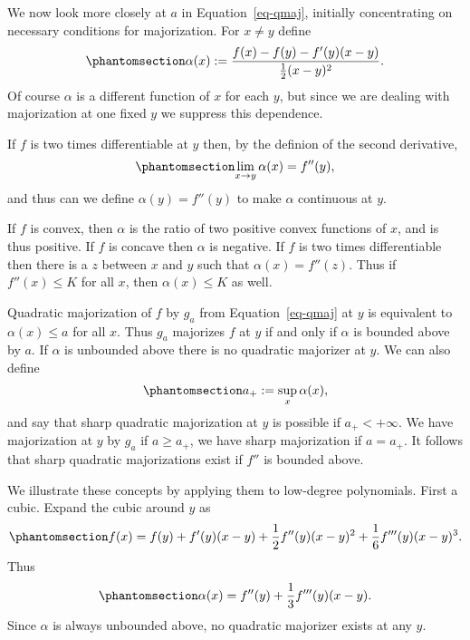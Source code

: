 \documentclass[
  12pt,
  letterpaper,
  DIV=11,
  numbers=noendperiod]{scrartcl}
\theoremstyle{plain}
\theoremstyle{plain}
\theoremstyle{plain}
\theoremstyle{definition}
\theoremstyle{definition}
\theoremstyle{remark}
\begin{document}
We now look more closely at \(a\) in Equation~\ref{eq-qmaj}, initially
concentrating on necessary conditions for majorization. For
\(x\not = y\) define \begin{equation}\phantomsection\label{eq-alpdef}{
\alpha(x):=\frac{f(x)-f(y)-f'(y)(x-y)}{\frac12(x-y)^2}.
}\end{equation} Of course \(\alpha\) is a different function of \(x\)
for each \(y\), but since we are dealing with majorization at one fixed
\(y\) we suppress this dependence.

If \(f\) is two times differentiable at \(y\) then, by the definion of
the second derivative, \begin{equation}\phantomsection\label{eq-alphop}{
\lim_{x\rightarrow y}\alpha(x)=f''(y),
}\end{equation} and thus can we define \(\alpha(y)=f''(y)\) to make
\(\alpha\) continuous at \(y\).

If \(f\) is convex, then \(\alpha\) is the ratio of two positive convex
functions of \(x\), and is thus positive. If \(f\) is concave then
\(\alpha\) is negative. If \(f\) is two times differentiable then there
is a \(z\) between \(x\) and \(y\) such that \(\alpha(x)=f''(z)\). Thus
if \(f''(x)\leq K\) for all \(x\), then \(\alpha(x)\leq K\) as well.

Quadratic majorization of \(f\) by \(g_a\) from Equation~\ref{eq-qmaj}
at \(y\) is equivalent to \(\alpha(x)\leq a\) for all \(x\). Thus
\(g_a\) majorizes \(f\) at \(y\) if and only if \(\alpha\) is bounded
above by \(a\). If \(\alpha\) is unbounded above there is no quadratic
majorizer at \(y\). We can also define
\begin{equation}\phantomsection\label{eq-aplus}{ 
a_+:=\sup_x\alpha(x),
}\end{equation} and say that sharp quadratic majorization at \(y\) is
possible if \(a_+<+\infty\). We have majorization at \(y\) by \(g_a\) if
\(a\geq a_+\), we have sharp majorization if \(a=a_+\). It follows that
sharp quadratic majorizations exist if \(f''\) is bounded above.

We illustrate these concepts by applying them to low-degree polynomials.
First a cubic. Expand the cubic around \(y\) as
\begin{equation}\phantomsection\label{eq-cubexp}{
f(x)=f(y)+f'(y)(x-y)+\frac12f''(y)(x-y)^2+\frac16f'''(y)(x-y)^3.
}\end{equation} Thus \begin{equation}\phantomsection\label{eq-cubalp}{
\alpha(x)=f''(y)+\frac13f'''(y)(x-y).
}\end{equation} Since \(\alpha\) is always unbounded above, no quadratic
majorizer exists at any \(y\).
\end{document}
